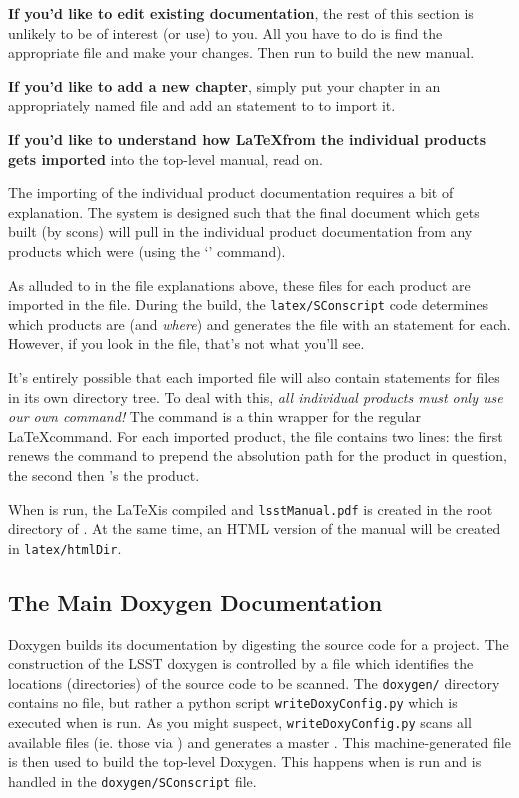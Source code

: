 {\bfseries If you'd like to edit existing documentation}, the rest of
this section is unlikely to be of interest (or use) to you.  All you
have to do is find the appropriate \tttex file and make your changes.
Then run \ttscons to build the new manual.

{\bfseries If you'd like to add a new chapter}, simply put your
chapter in an appropriately named \tttex file and add an \ttinput
statement to \ttlsstmanual to import it.

{\bfseries If you'd like to understand how \LaTeX from the individual
  products gets imported} into the top-level manual, read on.

The importing of the individual product documentation requires a bit
of explanation.  The system is designed such that the final document
which gets built (by scons) will pull in the individual product
documentation from any products which were \ttsetup (using the
\tteups `\ttsetup' command).

As alluded to in the file explanations above, these \tttex files for
each product are imported in the \ttlsstpackages file.
During the build, the \texttt{latex/SConscript} code determines which
products are \ttsetup (and {\itshape where}) and generates the
\ttlsstpackages file with an \ttinput statement for each.  However, if
you look in the \ttlsstpackages file, that's not what you'll see.

It's entirely possible that each imported \tttex file will also
contain \ttinput statements for files in its own directory tree.  To
deal with this, {\itshape all individual products must only use our
  own \ttlsstinput command!}  The \ttlsstinput command is a thin
wrapper for the regular \LaTeX \ttinput command.  For each imported
product, the \ttlsstpackages file contains two lines: the first renews
the \ttlsstinput command to prepend the absolution path for the
product in question, the second then \ttlsstinput's the product.

When \ttscons is run, the \LaTeX is compiled and
\texttt{lsstManual.pdf} is created in the root directory of
\ttdevenvdoc.  At the same time, an HTML version of the manual will be
created in \texttt{latex/htmlDir}.

\subsection{The Main Doxygen Documentation\label{sec-maindoxygen}}

Doxygen builds its documentation by digesting the source code for a
project.  The construction of the LSST doxygen is controlled by a
\ttdoxygenconf file which identifies the locations (directories) of the
source code to be scanned.  The \ttdevenvdoc \texttt{doxygen/}
directory contains no \ttdoxygenconf file, but rather a python script
\texttt{writeDoxyConfig.py} which is executed when \ttscons is run.
As you might suspect, \texttt{writeDoxyConfig.py} scans all available
\ttdoxygenconf files (ie. those \ttsetup via \tteups) and generates a
master \ttdoxygenconf.  This machine-generated file is then used to
build the top-level Doxygen.  This happens when \ttscons is run and is
handled in the \texttt{doxygen/SConscript} file.

